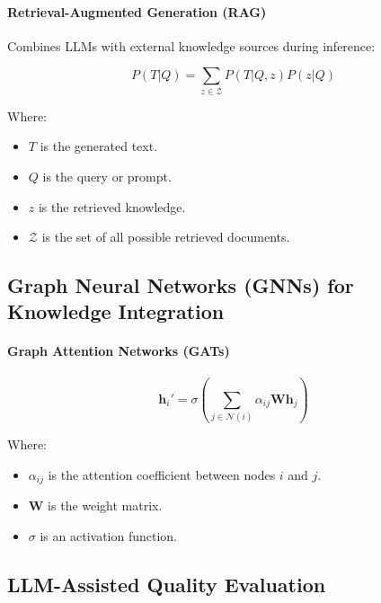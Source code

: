 \documentclass[12pt, a4paper]{article}
\begin{document}
\paragraph{Retrieval-Augmented Generation (RAG)}

Combines LLMs with external knowledge sources during inference:

\begin{equation}
P(T|Q) = \sum_{z \in \mathcal{Z}} P(T|Q, z) P(z|Q)
\end{equation}

Where:

\begin{itemize}
    \item \( T \) is the generated text.
    \item \( Q \) is the query or prompt.
    \item \( z \) is the retrieved knowledge.
    \item \( \mathcal{Z} \) is the set of all possible retrieved documents.
\end{itemize}

\subsection{Graph Neural Networks (GNNs) for Knowledge Integration}

\paragraph{Graph Attention Networks (GATs)}

\begin{equation}
\mathbf{h}_i' = \sigma\left( \sum_{j \in \mathcal{N}(i)} \alpha_{ij} \mathbf{W} \mathbf{h}_j \right)
\end{equation}

Where:

\begin{itemize}
    \item \( \alpha_{ij} \) is the attention coefficient between nodes \( i \) and \( j \).
    \item \( \mathbf{W} \) is the weight matrix.
    \item \( \sigma \) is an activation function.
\end{itemize}

\subsection{LLM-Assisted Quality Evaluation}
\end{document}
